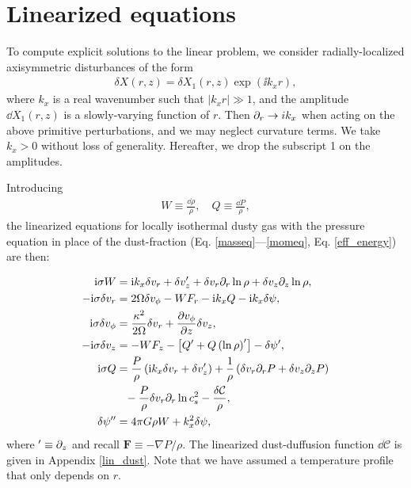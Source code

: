 \section{Linearized equations}\label{linear_problem}
To compute explicit solutions to the linear problem, 
we consider radially-localized axisymmetric disturbances of the form  
\begin{align}
  \delta X (r, z) = \delta X_1(r,z)\exp{(\ii k_x r)},
\end{align} 
where $k_x$ is a real wavenumber such that $|k_xr|\gg 1$, and the 
amplitude $\dd X_1(r,z)$ is 
a slowly-varying function of $r$. Then 
$\partial_r\to i k_x$ when acting on the above primitive perturbations, and we may
neglect curvature terms. We take  
$k_x>0$ without loss of generality. Hereafter, we drop the subscript 1
on the amplitudes. 

Introducing 
\begin{align}
  W \equiv \frac{\dd\rho}{\rho}, \quad Q \equiv \frac{\dd P}{\rho},
\end{align}
the linearized equations for 
locally isothermal dusty gas with the pressure
equation in place of the dust-fraction
(Eq. \ref{masseq}---\ref{momeq}, Eq. \ref{eff_energy}) are then:    

\begin{align}
  \ii\sigma W &= \ii k_x \dd v_r + \dd v_z^\prime +
  \dd v_r \p_r\ln{\rho} + \dd v_z\p_z\ln{\rho},\label{lin_mass}\\
  -\ii\sigma\dd v_r  &= 2\Omega\dd v_\phi 
- W F_r - \ii k_x Q - \ii k_x\dd\psi,\label{lin_xmom}\\
  \ii\sigma\dd v_\phi &= \frac{\kappa^2}{2\Omega}\dd v_r + \frac{\p
    v_\phi}{\p z}\dd v_z, \label{lin_ymom}\\
  -\ii\sigma\dd v_z &= - W F_z - \left[Q^\prime + Q
    \left(\ln{\rho}\right)^\prime\right] - \dd\psi^\prime  %
,\label{lin_zmom}\\
  \ii\sigma Q &= \frac{P}{\rho}\left(\ii k_x \dd v_r + \dd
               v_z^\prime\right) + \frac{1}{\rho}\left(\dd v_r\p_rP + \dd v_z \p_zP\right)\notag\\
                &\phantom{=}-\frac{P}{\rho} \dd v_r\p_r
               \ln{c_s^2} %
               - \frac{\dd\mathcal{C}}{\rho},\label{lin_energy}\\
\dd\psi^{\prime\prime}  &= 4\pi G \rho W + k_x^2\dd\psi, \label{lin_sg}
\end{align}  
where $^\prime \equiv \partial_z$ and recall $\bm{F} \equiv -\nabla P/\rho$. 
The linearized dust-duffusion function 
$\dd\mathcal{C}$ is given in  Appendix \ref{lin_dust}. 
Note that we have assumed a temperature profile that only depends on $r$.   

